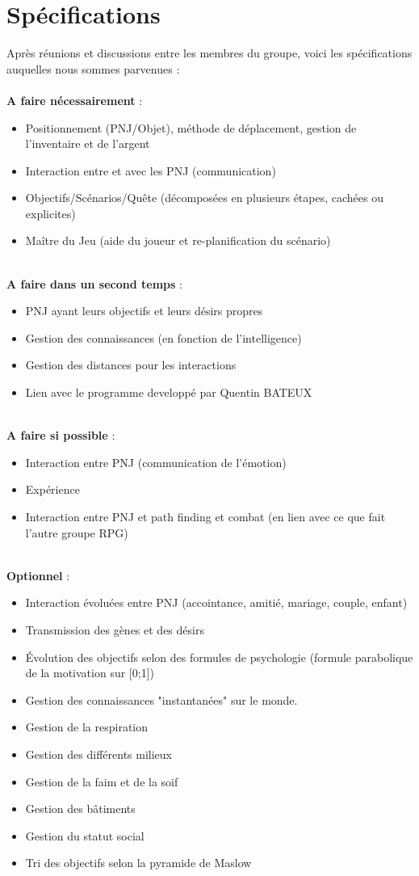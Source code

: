 \documentclass[asi]{picINSA}
\begin{document}
\chapter{Spécifications}
Après réunions et discussions entre les membres du groupe, voici les spécifications auquelles nous sommes parvenues : \\
~\\
\textbf{A faire nécessairement} :
\begin{itemize}
\item Positionnement (PNJ/Objet), méthode de déplacement, gestion de l'inventaire et de l'argent
\item Interaction entre et avec les PNJ (communication)
\item Objectifs/Scénarios/Quête (décomposées en plusieurs étapes, cachées ou explicites)
\item Maître du Jeu (aide du joueur et re-planification du scénario)
\end{itemize}
~\\
\textbf{A faire dans un second temps} :
\begin{itemize}
\item PNJ ayant leurs objectifs et leurs désirs propres
\item Gestion des connaissances (en fonction de l’intelligence)
\item Gestion des distances pour les interactions
\item Lien avec le programme developpé par Quentin BATEUX
\end{itemize}
~\\
\textbf{A faire si possible} :
\begin{itemize}
\item Interaction entre PNJ (communication de l'émotion)
\item Expérience
\item Interaction entre PNJ et path finding et combat (en lien avec ce que fait l'autre groupe RPG)
\end{itemize}
~\\
\textbf{Optionnel} :
\begin{itemize}
\item Interaction évoluées entre PNJ (accointance, amitié, mariage, couple, enfant)
\item Transmission des gènes et des désirs
\item Évolution des objectifs selon des formules de psychologie (formule parabolique de la motivation sur [0;1])
\item Gestion des connaissances "instantanées" sur le monde.
\item Gestion de la respiration
\item Gestion des différents milieux
\item Gestion de la faim et de la soif
\item Gestion des bâtiments
\item Gestion du statut social
\item Tri des objectifs selon la pyramide de Maslow
\end{itemize}
\end{document}
